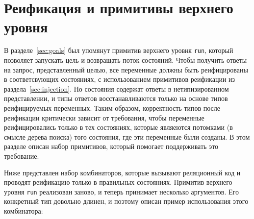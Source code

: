 
\section{Реификация и примитивы верхнего уровня }
\label{sec:reification}


В разделе~\ref{sec:goals} был упомянут примитив верхнего уровня \lstinline|run|, который позволяет запускать цель и возвращать поток состояний.
Чтобы получить ответы на запрос, представленный целью, все переменные должны быть реифицированы в соответсвующих состояниях, с использованием примитивов реификации из раздела~\ref{sec:injection}.
Но состояния содержат ответы в нетипизированном представлении, и типы ответов восстанавливаются только на основе типов реифицируемых переменных.
Таким образом, корректность типов после реификации критически зависит от требования, чтобы переменные реифицировались только в тех состояниях, которые являеются потомками (в смысле дерева поиска) того состояния, где эти переменные были созданы.
В этом разделе   описан набор примитивов, который помогает поддерживать это требование.


Ниже представлен набор комбинаторов, которые вызывают реляционный код и проводят реификацию только в правильных состояниях.
Примитив верхнего уровня \lstinline|run| реализован заново, и теперь принимает несколько аргументов.
Его конкретный тип довольно длинен, и поэтому описан пример   использования этого комбинатора:


